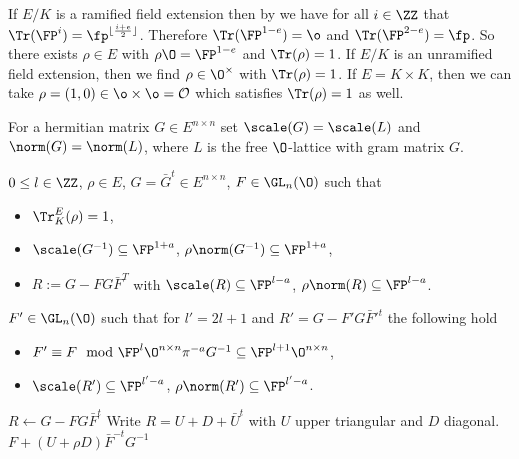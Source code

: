 If $E/K$ is a ramified field extension then by \cite[Ch. V,\S3, Lemma 3]{Serre1979} we have for all $i \in \ZZ$ that $\Tr(\FP^i) = \fp^{\lfloor \frac{i+e}{2}\rfloor}$. Therefore $\Tr(\FP^{1-e})=\o$ and $\Tr(\FP^{2-e})=\fp$. So there exists $\rho \in E$ with $\rho \O = \FP^{1-e}$ and $\Tr(\rho)=1$. If $E/K$ is an unramified field extension, then we find $\rho \in \O^\times$ with $\Tr(\rho)=1$. If $E = K \times K$, then we can take $\rho = (1, 0) \in \o\times \o=\mathcal{O}$ which satisfies $\Tr(\rho) = 1$ as well.

For a hermitian matrix $G \in E^{n \times n}$ set $\scale(G)=\scale(L)$ and $\norm(G)=\norm(L)$, where $L$ is the free $\O$-lattice with gram matrix $G$.

\begingroup
{}\label{alg:lift}
\endgroup
\begin{algorithmic}[1]
\REQUIRE
$0\leq l \in \ZZ$, $\rho \in E$,
$G =\bar G^t \in E^{n\times n}$,
$F \in \GL_n(\O)$ such that
\begin{itemize}
 \item $\Tr^E_K(\rho) =1$,
\item  $\scale(G^{-1})\subseteq \FP^{1+a}$, $\rho\norm(G^{-1})\subseteq \FP^{1+a}$,
\item $R:=G - FG\bar F^T$ with $\scale(R) \subseteq \FP^{l-a}$, $\rho\norm(R) \subseteq \FP^{l-a}$.
\end{itemize}
  \ENSURE $F' \in \GL_n(\O)$ such that for $l' = 2l + 1$ and $R' = G - F'G \bar F'^t$ the following hold
\begin{itemize}
  \item $F' \equiv F \mod \FP^{l} \O^{n \times n}\pi^{-a}G^{-1} \subseteq\FP^{l+1}\O^{n \times n}$,
  \item $\scale(R') \subseteq \FP^{l'-a}$, $\rho \norm(R') \subseteq \FP^{l'-a}$.
\end{itemize}
\STATE $R \gets G - F G \bar F^t$
\STATE Write $R = U + D + \bar U^t$ with $U$ upper triangular and $D$ diagonal.
\RETURN $F + (U + \rho D)\bar F^{-t}G^{-1}$
\end{algorithmic}\hrulefill \\

